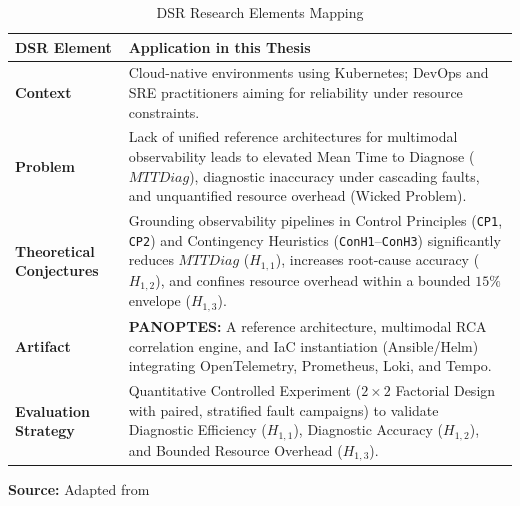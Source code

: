 \begin{table}[ht]
\centering
\caption{DSR Research Elements Mapping}
\label{tab:dsr-elements}
\begin{tabularx}{\textwidth}{|l|X|}
\hline
\textbf{DSR Element} & \textbf{Application in this Thesis} \\ \hline
\textbf{Context} & Cloud-native environments using Kubernetes; DevOps and SRE practitioners aiming for reliability under resource constraints. \\ \hline
\textbf{Problem} & Lack of unified reference architectures for multimodal observability leads to elevated Mean Time to Diagnose ($MTTDiag$), diagnostic inaccuracy under cascading faults, and unquantified resource overhead (Wicked Problem). \\ \hline
\textbf{Theoretical Conjectures} & Grounding observability pipelines in Control Principles (\texttt{CP1}, \texttt{CP2}) and Contingency Heuristics (\texttt{ConH1}--\texttt{ConH3}) significantly reduces $MTTDiag$ ($H_{1,1}$), increases root-cause accuracy ($H_{1,2}$), and confines resource overhead within a bounded $15\%$ envelope ($H_{1,3}$). \\ \hline
\textbf{Artifact} & \textbf{PANOPTES:} A reference architecture, multimodal RCA correlation engine, and IaC instantiation (Ansible/Helm) integrating OpenTelemetry, Prometheus, Loki, and Tempo. \\ \hline
\textbf{Evaluation Strategy} & Quantitative Controlled Experiment ($2\times2$ Factorial Design with paired, stratified fault campaigns) to validate Diagnostic Efficiency ($H_{1,1}$), Diagnostic Accuracy ($H_{1,2}$), and Bounded Resource Overhead ($H_{1,3}$). \\ \hline
\end{tabularx}
\par\medskip\ABNTEXfontereduzida\selectfont\textbf{Source:} Adapted from  \par\medskip
\end{table}

